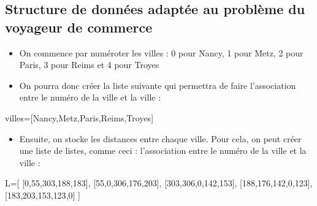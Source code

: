\documentclass[
  paper=a4,
  ,captions=tableheading
]{scrartcl}
\newenvironment{Shaded}{}{}
\newcommand{\DecValTok}[1]{\textcolor[rgb]{0.25,0.63,0.44}{#1}}
\newcommand{\NormalTok}[1]{#1}
\newcommand{\OperatorTok}[1]{\textcolor[rgb]{0.40,0.40,0.40}{#1}}
\newcommand{\StringTok}[1]{\textcolor[rgb]{0.25,0.44,0.63}{#1}}
\providecommand{\tightlist}{%
  \setlength{\itemsep}{0pt}\setlength{\parskip}{0pt}}
\begin{document}
\hypertarget{structure-de-donnuxe9es-adaptuxe9e-au-probluxe8me-du-voyageur-de-commerce}{%
\subsection{Structure de données adaptée au problème du voyageur de
commerce}\label{structure-de-donnuxe9es-adaptuxe9e-au-probluxe8me-du-voyageur-de-commerce}}

\begin{itemize}
\tightlist
\item
  On commence par numéroter les villes : 0 pour Nancy, 1 pour Metz, 2
  pour Paris, 3 pour Reims et 4 pour Troyes
\item
  On pourra donc créer la liste suivante qui permettra de faire
  l'association entre le numéro de la ville et la ville :
\end{itemize}

\begin{Shaded}
\begin{Highlighting}[]
\NormalTok{villes}\OperatorTok{=}\NormalTok{[}\StringTok{\textquotesingle{}Nancy\textquotesingle{}}\NormalTok{,}\StringTok{\textquotesingle{}Metz\textquotesingle{}}\NormalTok{,}\StringTok{\textquotesingle{}Paris\textquotesingle{}}\NormalTok{,}\StringTok{\textquotesingle{}Reims\textquotesingle{}}\NormalTok{,}\StringTok{\textquotesingle{}Troyes\textquotesingle{}}\NormalTok{]}
\end{Highlighting}
\end{Shaded}

\begin{itemize}
\tightlist
\item
  Ensuite, on stocke les distances entre chaque ville. Pour cela, on
  peut créer une liste de listes, comme ceci : l'association entre le
  numéro de la ville et la ville :
\end{itemize}

\begin{Shaded}
\begin{Highlighting}[]
\NormalTok{L}\OperatorTok{=}\NormalTok{[ }
\NormalTok{    [}\DecValTok{0}\NormalTok{,}\DecValTok{55}\NormalTok{,}\DecValTok{303}\NormalTok{,}\DecValTok{188}\NormalTok{,}\DecValTok{183}\NormalTok{],}
\NormalTok{    [}\DecValTok{55}\NormalTok{,}\DecValTok{0}\NormalTok{,}\DecValTok{306}\NormalTok{,}\DecValTok{176}\NormalTok{,}\DecValTok{203}\NormalTok{],}
\NormalTok{    [}\DecValTok{303}\NormalTok{,}\DecValTok{306}\NormalTok{,}\DecValTok{0}\NormalTok{,}\DecValTok{142}\NormalTok{,}\DecValTok{153}\NormalTok{],}
\NormalTok{    [}\DecValTok{188}\NormalTok{,}\DecValTok{176}\NormalTok{,}\DecValTok{142}\NormalTok{,}\DecValTok{0}\NormalTok{,}\DecValTok{123}\NormalTok{],}
\NormalTok{    [}\DecValTok{183}\NormalTok{,}\DecValTok{203}\NormalTok{,}\DecValTok{153}\NormalTok{,}\DecValTok{123}\NormalTok{,}\DecValTok{0}\NormalTok{]}
\NormalTok{]}
\end{Highlighting}
\end{Shaded}
\end{document}
